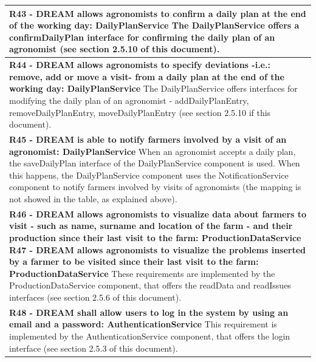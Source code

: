 \documentclass{article}
\begin{document}
\begin{longtable}[c]{|m{11.75cm}|}
    \textbf{R43 - DREAM allows agronomists to confirm a daily plan at the end of the working day: DailyPlanService}
    \newline\newline
    The DailyPlanService offers a confirmDailyPlan interface for confirming the daily plan of an agronomist (see section 2.5.10 of this document). \\
    \hline
    
    \textbf{R44 - DREAM allows agronomists to specify deviations -i.e.: remove, add or move a visit- from a daily plan at the end of the working day: DailyPlanService}
    \newline\newline
    The DailyPlanService offers interfaces for modifying the daily plan of an agronomist - addDailyPlanEntry, removeDailyPlanEntry, moveDailyPlanEntry (see section 2.5.10 if this document).\\
    \hline
    
    \textbf{R45 - DREAM is able to notify farmers involved by a visit of an agronomist: DailyPlanService}
    \newline\newline
    When an agronomist accepts a daily plan, the saveDailyPlan interface of the DailyPlanService component is used. When this happens, the DailyPlanService component uses the NotificationService component to notify farmers involved by visits of agronomists (the mapping is not showed in the table, as explained above). \\
    \hline
    
    \textbf{R46 - DREAM allows agronomists to visualize data about farmers to visit - such as name, surname and location of the farm - and their production since their last visit to the farm: ProductionDataService
    \newline\newline
    R47 - DREAM allows agronomists to visualize the problems inserted by a farmer to be visited since their last visit to the farm: ProductionDataService}
    \newline\newline
    These requirements are implemented by the ProductionDataService component, that offers the readData and readIssues interfaces (see section 2.5.6 of this document). \\
    \hline
    
    \textbf{R48 - DREAM shall allow users to log in the system by using an email and a password: AuthenticationService}
    \newline\newline
    This requirement is implemented by the AuthenticationService component, that offers the login interface (see section 2.5.3 of this document). \\
    \hline
    

\end{longtable}
\end{document}
